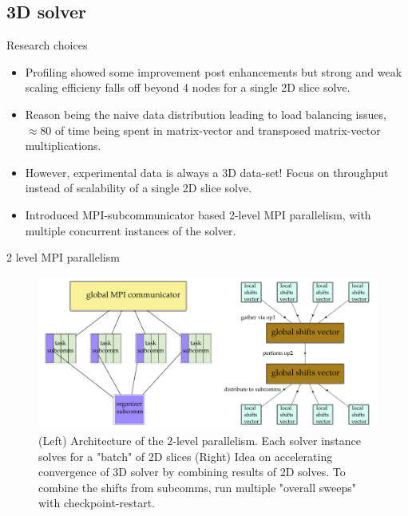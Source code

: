 \documentclass{beamer}
\begin{document}
\subsection{3D solver}
\begin{frame}{Research choices}
	\begin{itemize}
		\item Profiling showed some improvement post enhancements but strong and weak scaling efficieny falls off beyond 4 nodes for a single 2D slice solve. 
		\item Reason being the naive data distribution leading to load balancing issues, $\approx80$ of time being spent in matrix-vector and transposed matrix-vector multiplications. 
		\item However, experimental data is always a 3D data-set! Focus on throughput instead of scalability of a single 2D slice solve. 
		\item Introduced MPI-subcommunicator based 2-level MPI parallelism, with multiple concurrent instances of the solver.
	\end{itemize}
\end{frame}

\begin{frame}{2 level MPI parallelism}
	\begin{center}
		\begin{figure}
			\hspace*{-1cm}\includegraphics[scale=0.3125]{figures/2level.png}
			\caption{(Left) Architecture of the 2-level parallelism. Each solver instance solves for a "batch" of 2D slices (Right) Idea on accelerating convergence of 3D solver by combining results of 2D solves. To combine the shifts from subcomms, run multiple "overall sweeps" with checkpoint-restart. }
		\end{figure}
	\end{center}
\end{frame}
\end{document}
